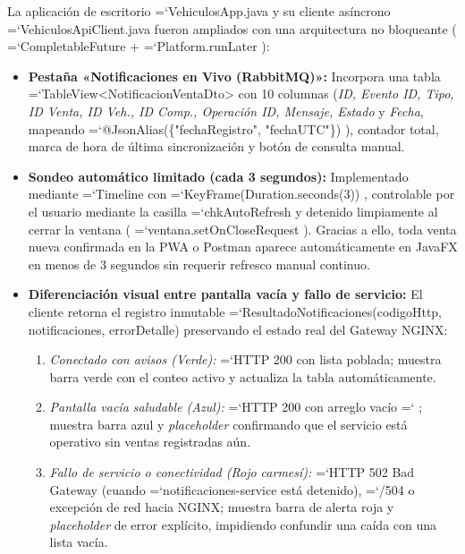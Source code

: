 \documentclass[11pt,a4paper]{article}
\renewcommand{\_}{\oldunderscore\allowbreak}
\DeclareRobustCommand{\texttt}[1]{%
  {\upshape\ttfamily\fontsize{9}{10.8}\selectfont\hyphenchar\font=`\-\relax #1}%
}
\begin{document}
\noindent La aplicación de escritorio \texttt{VehiculosApp.\allowbreak{}java} y su cliente asíncrono \texttt{VehiculosApiClient.\allowbreak{}java} fueron ampliados con una arquitectura no bloqueante (\texttt{CompletableFuture} + \texttt{Platform.\allowbreak{}runLater}):
\begin{itemize}[leftmargin=*,itemsep=2pt,topsep=1pt]
  \item \textbf{Pestaña «Notificaciones en Vivo (RabbitMQ)»:} Incorpora una tabla \texttt{TableView<\allowbreak{}NotificacionVentaDto>} con 10 columnas (\textit{ID, Evento ID, Tipo, ID Venta, ID Veh., ID Comp., Operación ID, Mensaje, Estado} y \textit{Fecha}, mapeando \texttt{@JsonAlias(\{"fechaRegistro", "fechaUTC"\})}), contador total, marca de hora de última sincronización y botón de consulta manual.
  \item \textbf{Sondeo automático limitado (cada 3 segundos):} Implementado mediante \texttt{Timeline} con \texttt{KeyFrame(Duration.\allowbreak{}seconds(3))}, controlable por el usuario mediante la casilla \texttt{chkAutoRefresh} y detenido limpiamente al cerrar la ventana (\texttt{ventana.\allowbreak{}setOnCloseRequest}). Gracias a ello, toda venta nueva confirmada en la PWA o Postman aparece automáticamente en JavaFX en menos de 3 segundos sin requerir refresco manual continuo.
  \item \textbf{Diferenciación visual entre pantalla vacía y fallo de servicio:} El cliente retorna el registro inmutable \texttt{ResultadoNotificaciones(codigoHttp, notificaciones, errorDetalle)} preservando el estado real del Gateway NGINX:
  \begin{enumerate}[leftmargin=*,itemsep=1pt,topsep=1pt]
    \item \textit{Conectado con avisos (Verde):} \texttt{HTTP 200} con lista poblada; muestra barra verde con el conteo activo y actualiza la tabla automáticamente.
    \item \textit{Pantalla vacía saludable (Azul):} \texttt{HTTP 200} con arreglo vacío \texttt{[]}; muestra barra azul y \textit{placeholder} confirmando que el servicio está operativo sin ventas registradas aún.
    \item \textit{Fallo de servicio o conectividad (Rojo carmesí):} \texttt{HTTP 502 Bad Gateway} (cuando \texttt{notificaciones-service} está detenido), \texttt{503/504} o excepción de red hacia NGINX; muestra barra de alerta roja y \textit{placeholder} de error explícito, impidiendo confundir una caída con una lista vacía.
  \end{enumerate}
\end{itemize}
\end{document}
